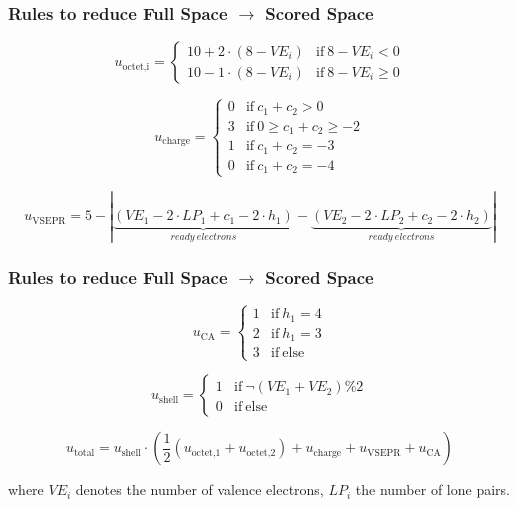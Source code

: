 \documentclass[xcolor=dvipsnames]{beamer}
\newcommand*\circled[1]{\tikz[baseline=(char.base)]{
		\node[shape=circle,draw,inner sep=2pt] (char) {#1};}}
\begin{document}
\begin{frame}
\frametitle{Rules \circled{1} to reduce Full Space $\rightarrow$ Scored Space}
\begin{equation}
u_{\textrm{octet,i}} = 
\begin{cases}
10 + 2 \cdot (8-VE_i) 	& \mathrm{if}~ 8-VE_i < 0 \\
10 - 1 \cdot (8-VE_i) 	& \mathrm{if}~ 8-VE_i \geq 0
\end{cases}
\end{equation}

\begin{equation}
u_{\textrm{charge}} = 
\begin{cases}
0	&	\mathrm{if}~ c_1 + c_2 > 0 \\
3	&	\mathrm{if}~ 0 \geq c_1 + c_2 \geq -2 \\
1   &	\mathrm{if}~ c_1 + c_2 = -3 \\
0   &	\mathrm{if}~ c_1 + c_2 = -4 
\end{cases}
\end{equation}

\begin{equation}
u_{\textrm{VSEPR}} = 
 5-|\underbrace{(VE_1 - 2 \cdot LP_1 + c_1 - 2 \cdot h_1)}_{ready~electrons} -  \underbrace{(VE_2 - 2 \cdot LP_2 + c_2 - 2 \cdot h_2)}_{ready~electrons}|
\end{equation}
\end{frame}

\begin{frame}
\frametitle{Rules \circled{1} to reduce Full Space $\rightarrow$ Scored Space}

\begin{equation}
u_{\textrm{CA}} = 
\begin{cases}
1	&	\mathrm{if}~ h_1 = 4 \\
2	&	\mathrm{if}~ h_1 = 3 \\
3   &	\mathrm{if}~ \textrm{else} 
\end{cases}
\end{equation}

\begin{equation}
u_{\textrm{shell}} = 
\begin{cases}
1	&	\mathrm{if}~ \neg (VE_1+VE_2) \% 2 \\
0	&	\mathrm{if}~ \textrm{else}
\end{cases}
\end{equation}

\begin{equation}
u_{\textrm{total}} = u_{\textrm{shell}} \cdot \left( \frac{1}{2} ( u_{\textrm{octet,1}} + u_{\textrm{octet,2}} ) + u_{\textrm{charge}} + u_{\textrm{VSEPR}} + u_{\textrm{CA}} \right)
\end{equation}

where $VE_i$ denotes the number of valence electrons, $LP_i$ the number of lone pairs.
\end{frame}
\end{document}
